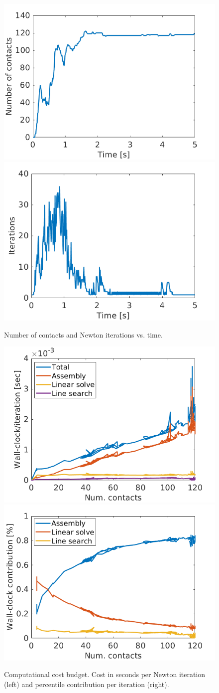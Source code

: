 \begin{figure}[!h]
	\centering
	\includegraphics[width=0.45\columnwidth]{figures/pile_of_objects/number_of_contacts.png}
	\includegraphics[width=0.45\columnwidth]{figures/pile_of_objects/newton_iterations.png}\\
	\caption{\label{fig:clutter_iterations} 
	Number of contacts and Newton iterations vs. time. }
\end{figure}

\begin{figure}[!h]
	\centering
	\includegraphics[width=0.45\columnwidth]{figures/pile_of_objects/wall_clock_vs_contacts.png}
	\includegraphics[width=0.45\columnwidth]{figures/pile_of_objects/wall_clock_contributions_vs_contacts.png}\\
	\caption{\label{fig:clutter_cost_budget} 
	Computational cost budget. Cost in seconds per Newton iteration (left) and
	percentile contribution per iteration (right).}
\end{figure}

